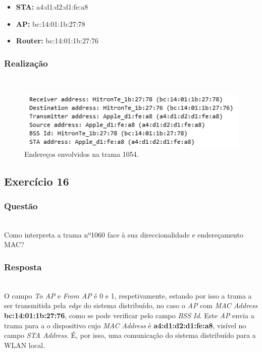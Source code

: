 \documentclass{llncs}
\begin{document}
\begin{itemize}
  \item \textbf{STA:} a4:d1:d2:d1:fe:a8

  \item \textbf{AP:} bc:14:01:1b:27:78

  \item \textbf{Router:} bc:14:01:1b:27:76
\end{itemize}

\subsubsection{Realização}\rule[-10pt]{0pt}{10pt}\\

\begin{figure}
  \begin{center}
  \includegraphics[scale=0.6]{./imagens/p15.png} 
  \end{center}
  \caption{Endereços envolvidos na trama 1054.}
  \label{fig:control_frame}
\end{figure}

\clearpage
\subsection{Exercício 16}
\subsubsection{Questão}\rule[-10pt]{0pt}{10pt}\\

Como interpreta a trama nº1060 face à sua direccionalidade e endereçamento MAC?

\subsubsection{Resposta}\rule[-10pt]{0pt}{10pt}\\

O campo \textit{To AP} e \textit{From AP} é 0 e 1, respetivamente, estando por isso a trama a ser transmitida pela \textit{edge} do sistema distribuído, no caso o \textit{AP} com \textit{MAC Address} \textbf{bc:14:01:1b:27:76}, como se pode verificar pelo campo \textit{BSS Id}.
Este \textit{AP} envia a trama para a o dispositivo cujo \textit{MAC Address} é \textbf{a4:d1:d2:d1:fe:a8}, visível no campo \textit{STA Address}.
É, por isso, uma comunicação do sistema distribuído para a WLAN local.
\end{document}
